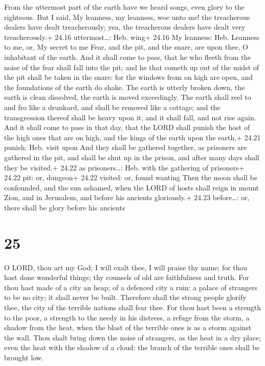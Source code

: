  From the uttermost part of the earth have we heard
songs, even glory to the righteous. But I said, My leanness, my
leanness, woe unto me! the treacherous dealers have dealt treacherously;
yea, the treacherous dealers have dealt very treacherously.+ 24.16
uttermost\ldots: Heb. wing+ 24.16 My leanness: Heb. Leanness to me, or,
My secret to me  Fear, and the pit, and the snare, are upon
thee, O inhabitant of the earth.  And it shall come to
pass, that he who fleeth from the noise of the fear shall fall into the
pit; and he that cometh up out of the midst of the pit shall be taken in
the snare: for the windows from on high are open, and the foundations of
the earth do shake.  The earth is utterly broken down, the
earth is clean dissolved, the earth is moved exceedingly. 
The earth shall reel to and fro like a drunkard, and shall be removed
like a cottage; and the transgression thereof shall be heavy upon it;
and it shall fall, and not rise again.  And it shall come
to pass in that day, that the LORD shall punish the host of the high
ones that are on high, and the kings of the earth upon the earth.+ 24.21
punish: Heb. visit upon  And they shall be gathered
together, as prisoners are gathered in the pit, and shall be shut up in
the prison, and after many days shall they be visited.+ 24.22 as
prisoners\ldots: Heb. with the gathering of prisoners+ 24.22 pit: or,
dungeon+ 24.22 visited: or, found wanting  Then the moon
shall be confounded, and the sun ashamed, when the LORD of hosts shall
reign in mount Zion, and in Jerusalem, and before his ancients
gloriously.+ 24.23 before\ldots: or, there shall be glory before his
ancients

\hypertarget{section-24}{%
\section{25}\label{section-24}}

 O LORD, thou art my God; I will exalt thee, I will praise
thy name; for thou hast done wonderful things; thy counsels of old are
faithfulness and truth.  For thou hast made of a city an
heap; of a defenced city a ruin: a palace of strangers to be no city; it
shall never be built.  Therefore shall the strong people
glorify thee, the city of the terrible nations shall fear thee.
 For thou hast been a strength to the poor, a strength to
the needy in his distress, a refuge from the storm, a shadow from the
heat, when the blast of the terrible ones is as a storm against the
wall.  Thou shalt bring down the noise of strangers, as the
heat in a dry place; even the heat with the shadow of a cloud: the
branch of the terrible ones shall be brought low.

